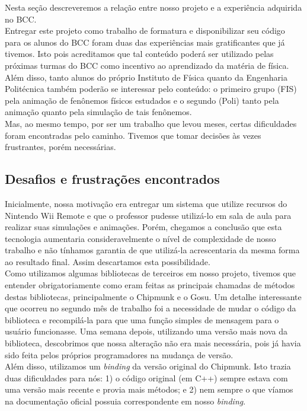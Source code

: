 Nesta seção descreveremos a relação entre nosso projeto e a experiência adquirida no BCC.\\ 

Entregar este projeto como trabalho de formatura e disponibilizar seu código para os alunos do BCC foram duas das experiências mais gratificantes que já tivemos. Isto pois acreditamos que tal conteúdo poderá ser utilizado pelas próximas turmas do BCC como incentivo ao aprendizado da matéria de física. Além disso, tanto alunos do próprio Instituto de Física quanto da Engenharia Politécnica também poderão se interessar pelo conteúdo: o primeiro grupo (FIS) pela animação de fenônemos físicos estudados e o segundo (Poli) tanto pela animação quanto pela simulação de tais fenônemos. \\

Mas, ao mesmo tempo, por ser um trabalho que levou meses, certas dificuldades foram encontradas pelo caminho. Tivemos que tomar decisões às vezes frustrantes, porém necessárias.\\

\subsection{Desafios e frustrações encontrados}
Inicialmente, nossa motivação era entregar um sistema que utilize recursos do Nintendo Wii Remote \cite{wii} e que o professor pudesse utilizá-lo em sala de aula para realizar suas simulações e animações. Porém, chegamos a conclusão que esta tecnologia aumentaria consideravelmente o nível de complexidade de nosso trabalho e não tínhamos garantia de que utilizá-la acrescentaria da mesma forma ao resultado final. Assim descartamos esta possibilidade.\\

Como utilizamos algumas bibliotecas de terceiros em nosso projeto, tivemos que entender obrigatoriamente como eram feitas as principais chamadas de métodos destas bibliotecas, principalmente o Chipmunk e o Gosu. Um detalhe interessante que ocorreu no segundo mês de trabalho foi a necessidade de mudar o código da biblioteca e recompilá-la para que uma função simples de mensagem para o usuário funcionasse. Uma semana depois, utilizando uma versão mais nova da biblioteca, descobrimos que nossa alteração não era mais necessária, pois já havia sido feita pelos próprios programadores na mudança de versão.\\

Além disso, utilizamos um \textit{binding} da versão original do Chipmunk. Isto trazia duas dificuldades para nós: 1) o código original (em C++) sempre estava com uma versão mais recente e provia mais métodos; e 2) nem sempre o que víamos na documentação oficial possuia correspondente em nosso \textit{binding}. \\
 
